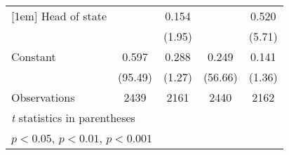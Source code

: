 {\begin{tabular}{l*{4}{c}}
[1em]
Head of state       &                     &       0.154         &                     &       0.520\sym{***}\\
                    &                     &      (1.95)         &                     &      (5.71)         \\
[1em]
Constant            &       0.597\sym{***}&       0.288         &       0.249\sym{***}&       0.141         \\
                    &     (95.49)         &      (1.27)         &     (56.66)         &      (1.36)         \\
\hline
Observations        &        2439         &        2161         &        2440         &        2162         \\
\hline\hline
\multicolumn{5}{l}{\footnotesize \textit{t} statistics in parentheses}\\
\multicolumn{5}{l}{\footnotesize \sym{*} \(p<0.05\), \sym{**} \(p<0.01\), \sym{***} \(p<0.001\)}\\
\end{tabular}
}
